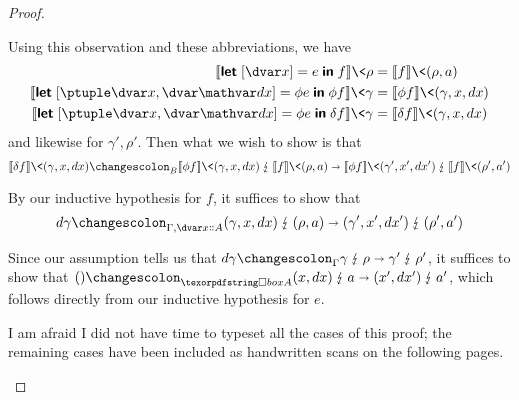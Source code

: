 \begin{proof}
\begin{description}[itemsep=1\baselineskip]
    Using this observation and these abbreviations, we have
%
    \begin{align*}
      \den{\eletbox x e f} \<\rho &= \den{f}\<(\rho, a)
      \\
      \den{\elet{\pboxtuple{\dvar x, \dvar\dx} = \phi e} \phi f} \<\gamma
      &= \den{\phi f}\<(\gamma, x, dx)
      \\
      \den{\elet{\pboxtuple{\dvar x, \dvar\dx} = \phi e} \delta f} \<\gamma
      &= \den{\delta f}\<(\gamma, x, dx)
    \end{align*}
%
    and likewise for $\gamma', \rho'$. Then what we wish to show is that
%
    \[
    \weirdat B
             {\den{\delta f}\<(\gamma, x, dx)}
             {\den{\phi f}\<(\gamma, x, dx)}
             {\den{f}\<(\rho, a)}
             {\den{\phi f}\<(\gamma', x', dx')}
             {\den{f}\<(\rho', a')}
    \]

    \noindent
    By our inductive hypothesis for $f$, it suffices to show that
%
    \[\weirdat{\Gamma, \hd x A}
              {\dgamma}
              {(\gamma, x, dx)}
              {(\rho, a)}
              {(\gamma', x', dx')}
              {(\rho', a')}
    \]

    \noindent
    Since our assumption tells us that
%
    \(
    \weirdat{\Gamma}\dgamma\gamma\rho{\gamma'}{\rho'}
    \),
%
    it suffices to show that
%
    \(
    \weirdat{\iso A}{()}{(x, dx)}{a}{(x', dx')}{a'}
    \),
%
    which follows directly from our inductive hypothesis for $e$.

  \item[Remaining cases.] I am afraid I did not have time to typeset all the cases of this proof; the remaining cases have been included as handwritten scans on the following pages.
    
  \end{description}

  
\end{proof}
